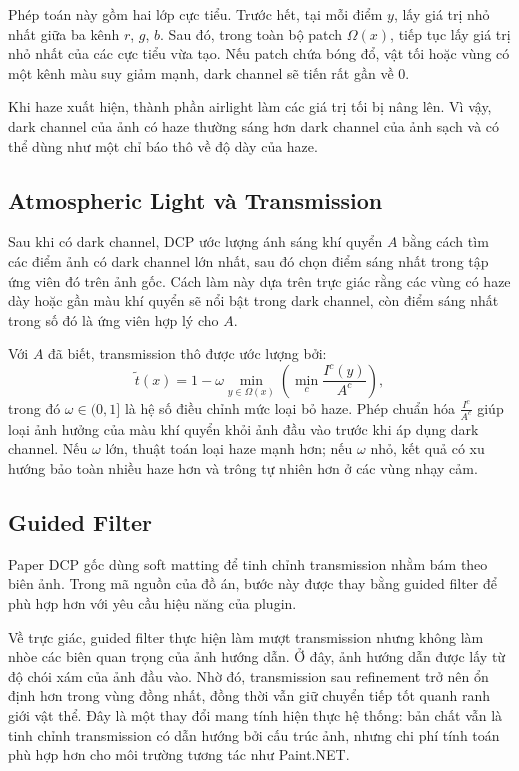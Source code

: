Phép toán này gồm hai lớp cực tiểu. Trước hết, tại mỗi điểm \(y\), lấy giá trị nhỏ nhất giữa ba kênh \(r\), \(g\), \(b\). Sau đó, trong toàn bộ patch \(\Omega(x)\), tiếp tục lấy giá trị nhỏ nhất của các cực tiểu vừa tạo. Nếu patch chứa bóng đổ, vật tối hoặc vùng có một kênh màu suy giảm mạnh, dark channel sẽ tiến rất gần về \(0\).

Khi haze xuất hiện, thành phần airlight làm các giá trị tối bị nâng lên. Vì vậy, dark channel của ảnh có haze thường sáng hơn dark channel của ảnh sạch và có thể dùng như một chỉ báo thô về độ dày của haze.

\subsection{Atmospheric Light và Transmission}

Sau khi có dark channel, DCP ước lượng ánh sáng khí quyển \(A\) bằng cách tìm các điểm ảnh có dark channel lớn nhất, sau đó chọn điểm sáng nhất trong tập ứng viên đó trên ảnh gốc. Cách làm này dựa trên trực giác rằng các vùng có haze dày hoặc gần màu khí quyển sẽ nổi bật trong dark channel, còn điểm sáng nhất trong số đó là ứng viên hợp lý cho \(A\).

Với \(A\) đã biết, transmission thô được ước lượng bởi:
\begin{equation}
\tilde{t}(x)=1-\omega \min_{y\in\Omega(x)} \left(\min_c \frac{I^c(y)}{A^c}\right),
\end{equation}
trong đó \(\omega \in (0,1]\) là hệ số điều chỉnh mức loại bỏ haze. Phép chuẩn hóa \(\frac{I^c}{A^c}\) giúp loại ảnh hưởng của màu khí quyển khỏi ảnh đầu vào trước khi áp dụng dark channel. Nếu \(\omega\) lớn, thuật toán loại haze mạnh hơn; nếu \(\omega\) nhỏ, kết quả có xu hướng bảo toàn nhiều haze hơn và trông tự nhiên hơn ở các vùng nhạy cảm.

\subsection{Guided Filter}

Paper DCP gốc dùng soft matting để tinh chỉnh transmission nhằm bám theo biên ảnh. Trong mã nguồn của đồ án, bước này được thay bằng guided filter để phù hợp hơn với yêu cầu hiệu năng của plugin.

Về trực giác, guided filter thực hiện làm mượt transmission nhưng không làm nhòe các biên quan trọng của ảnh hướng dẫn. Ở đây, ảnh hướng dẫn được lấy từ độ chói xám của ảnh đầu vào. Nhờ đó, transmission sau refinement trở nên ổn định hơn trong vùng đồng nhất, đồng thời vẫn giữ chuyển tiếp tốt quanh ranh giới vật thể. Đây là một thay đổi mang tính hiện thực hệ thống: bản chất vẫn là tinh chỉnh transmission có dẫn hướng bởi cấu trúc ảnh, nhưng chi phí tính toán phù hợp hơn cho môi trường tương tác như Paint.NET.

